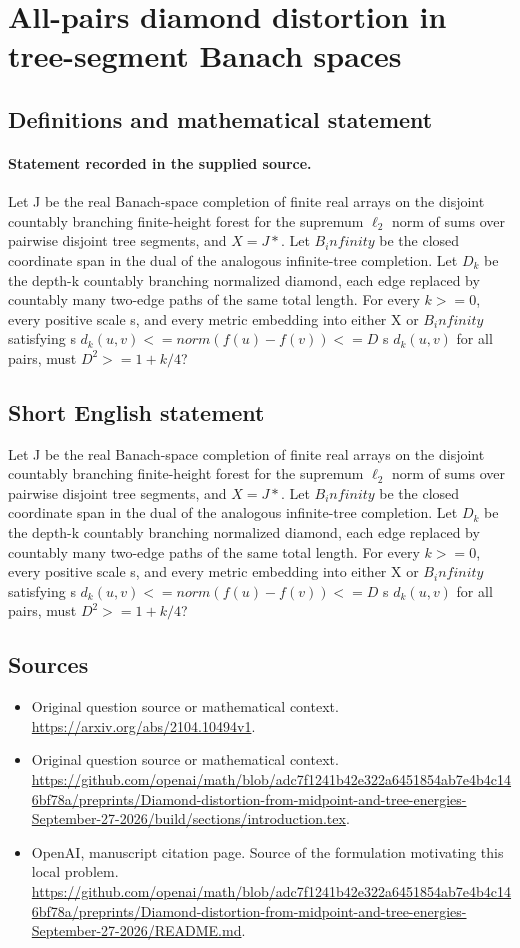 \documentclass[11pt]{article}
\begin{document}
\section*{All-pairs diamond distortion in tree-segment Banach spaces}\label{30007189}
\subsection{Definitions and mathematical statement}
\paragraph{Statement recorded in the supplied source.}
Let J be the real Banach-space completion of finite real arrays on the disjoint countably branching finite-height forest for the supremum $\ell _2$ norm of sums over pairwise disjoint tree segments, and $X=J*$. Let $B_infinity$ be the closed coordinate span in the dual of the analogous infinite-tree completion. Let $D_k$ be the depth-k countably branching normalized diamond, each edge replaced by countably many two-edge paths of the same total length. For every $k>=0$, every positive scale s, and every metric embedding into either X or $B_infinity$ satisfying s $d_k(u,v)<=norm(f(u)-f(v))<=D$ s $d_k(u,v)$ for all pairs, must $D^2>=1+k/4$?
\subsection{Short English statement}
Let J be the real Banach-space completion of finite real arrays on the disjoint countably branching finite-height forest for the supremum $\ell _2$ norm of sums over pairwise disjoint tree segments, and $X=J*$. Let $B_infinity$ be the closed coordinate span in the dual of the analogous infinite-tree completion. Let $D_k$ be the depth-k countably branching normalized diamond, each edge replaced by countably many two-edge paths of the same total length. For every $k>=0$, every positive scale s, and every metric embedding into either X or $B_infinity$ satisfying s $d_k(u,v)<=norm(f(u)-f(v))<=D$ s $d_k(u,v)$ for all pairs, must $D^2>=1+k/4$?
\subsection{Sources}
\begin{itemize}
\item[S1] Original question source or mathematical context.
\url{https://arxiv.org/abs/2104.10494v1}.
\item[S2] Original question source or mathematical context.
\url{https://github.com/openai/math/blob/adc7f1241b42e322a6451854ab7e4b4c146bf78a/preprints/Diamond-distortion-from-midpoint-and-tree-energies-September-27-2026/build/sections/introduction.tex}.
\item[S3] OpenAI, manuscript citation page. Source of the formulation motivating this local problem.
\url{https://github.com/openai/math/blob/adc7f1241b42e322a6451854ab7e4b4c146bf78a/preprints/Diamond-distortion-from-midpoint-and-tree-energies-September-27-2026/README.md}.
\end{itemize}
\end{document}
